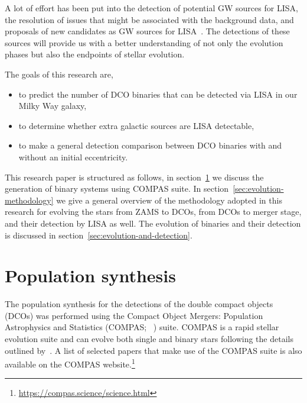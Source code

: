 \documentclass[journal, twocolumn]{IEEEtran}
\begin{document}
    A lot of effort has been put into the detection of potential GW sources for LISA, the resolution of issues that might be associated with the background data, and proposals of new candidates as GW sources for LISA~\cite[see, for example,][]{Lau2020, Sesana2009, Khakhaleva2020, Renzo2021, Fumagalli2022, wagg2021gravitational, Broekgaarden2021, Shao2021, Andrews2020, Belczynski2010, Guo2017, Babak2010, Blaut2010, Babak2008, Ruiter2010, Nelemans2001, Yu2010}.
    The detections of these sources will provide us with a better understanding of not only the evolution phases but also the endpoints of stellar evolution.

    The goals of this research are,
    \begin{itemize}%
        \item to predict the number of DCO binaries that can be detected via LISA in our Milky Way galaxy,
        \item to determine whether extra galactic sources are LISA detectable,
        \item to make a general detection comparison between DCO binaries with and without an initial eccentricity.
    \end{itemize}%

	This research paper is structured as follows, in section~\ref{sec:population_synthesis} we discuss the generation of binary systems using COMPAS suite. In section~\ref{sec:evolution-methodology} we give a general overview of the methodology adopted in this research for evolving the stars from ZAMS to DCOs, from DCOs to merger stage, and their detection by LISA as well. The evolution of binaries and their detection is discussed in section~\ref{sec:evolution-and-detection}.

    \section{Population synthesis}
    \label{sec:population_synthesis}
    The population synthesis for the detections of the double compact objects (DCOs) was performed using the Compact Object Mergers: Population Astrophysics and Statistics (COMPAS; ~\cite{stevenson2017formation, Riley2022, Vigna2018}) suite.
    COMPAS is a rapid stellar evolution suite and can evolve both single and binary stars following the details outlined by~\cite{Hurley2000, Hurley2002}.
    A list of selected papers that make use of the COMPAS suite is also available on the COMPAS website.\footnote{\url{https://compas.science/science.html}}
\end{document}
